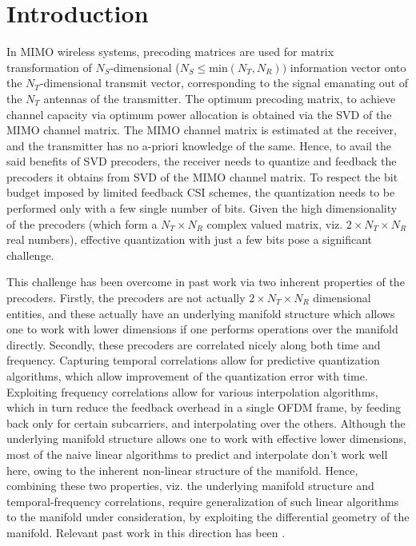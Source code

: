 \documentclass[conference]{IEEEtran}
\begin{document}
\section{Introduction}
\label{intro}
In MIMO wireless systems, precoding matrices are used for matrix transformation of $N_S$-dimensional ($N_S \leq \text{min}(N_T,N_R))$ information vector onto the $N_T$-dimensional transmit vector, corresponding to the signal emanating out of the $N_T$ antennas of the transmitter.
The optimum precoding matrix, to achieve channel capacity via optimum power allocation is obtained via the SVD of the MIMO channel matrix. \cite{love2008overview}
The MIMO channel matrix is estimated at the receiver, and the transmitter has no a-priori knowledge of the same.
Hence, to avail the said benefits of SVD precoders, the receiver needs to quantize and feedback the precoders it obtains from SVD of the MIMO channel matrix.
To respect the bit budget imposed by limited feedback CSI schemes, the quantization needs to be performed only with a few single number of bits.
Given the high dimensionality of the precoders (which form a $N_T \times N_R$ complex valued matrix, viz. $2\times N_T\times N_R$ real numbers), effective quantization with just a few bits pose a significant challenge.

This challenge has been overcome in past work via two inherent properties of the precoders. 
Firstly, the precoders are not actually $2\times N_T\times N_R$ dimensional entities, and these actually have an underlying manifold structure which allows one to work with lower dimensions if one performs operations over the manifold directly.
Secondly, these precoders are correlated nicely along both time and frequency. 
Capturing temporal correlations allow for predictive quantization algorithms, which allow improvement of the quantization error with time.
Exploiting frequency correlations allow for various interpolation algorithms, which in turn reduce the feedback overhead in a single OFDM frame, by feeding back only for certain subcarriers, and interpolating over the others.
Although the underlying manifold structure allows one to work with effective lower dimensions, most of the naive linear algorithms to predict and interpolate don't work well here, owing to the inherent non-linear structure of the manifold.
Hence, combining these two properties, viz. the underlying manifold structure and temporal-frequency correlations, require generalization of such linear algorithms to the manifold under consideration, by exploiting the differential geometry of the manifold. Relevant past work in this direction has been \cite{Gupt1905:Predictive,6891198,6545375,5671092,Li2016,khaled2005quantized,krishnamachari2013geometry}.
\end{document}

